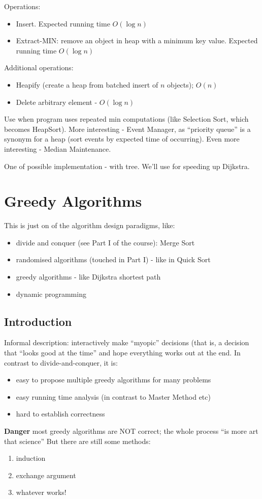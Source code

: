 \documentclass{scrartcl}
\begin{document}
Operations:
\begin{itemize}
\item Insert. Expected running time $O(\log n)$
\item Extract-MIN: remove an object in heap with a minimum key value. Expected
  running time $O(\log n)$
\end{itemize}
Additional operations:
\begin{itemize}
\item Heapify (create a heap from batched insert of $n$ objects); $O(n)$
\item Delete arbitrary element - $O(\log n)$
\end{itemize}
Use when program uses repeated min computations (like Selection Sort, which
becomes HeapSort). More interesting - Event Manager, as ``priority queue'' is a
synonym for a heap (sort events by expected time of occurring). Even more
interesting - Median Maintenance.

One of possible implementation - with tree. We'll use for speeding up Dijkstra.

\section{Greedy Algorithms}
\label{sec:Section3}
This is just on of the algorithm design paradigms, like:
\begin{itemize}
\item divide and conquer (see Part I of the course): Merge Sort
\item randomised algorithms (touched in Part I) - like in Quick Sort
\item greedy algorithms - like Dijkstra shortest path
\item dynamic programming
\end{itemize}
\subsection{Introduction}
\label{sec:3-1}
Informal description: interactively make ``myopic'' decisions (that is, a
decision that ``looks good at the time'' and hope everything works out at the
end. In contrast to divide-and-conquer, it is:
\begin{itemize}
\item easy to propose multiple greedy algorithms for many problems
\item easy running time analysis (in contrast to Master Method etc)
\item hard to establish correctness
\end{itemize} {\bf Danger} most greedy algorithms are NOT correct; the whole
process ``is more art that science'' But there are still some methods:
\begin{enumerate}
\item induction
\item exchange argument
\item whatever works!
\end{enumerate}
\end{document}
